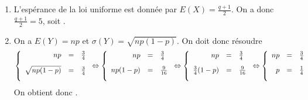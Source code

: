 \documentclass[a4paper, 11pt,reqno]{article}
\begin{document}
\begin{correction}  \;
	\begin{enumerate}
		\item L'esp\'erance de la loi uniforme est donn\'ee par $E(X) = \frac{q+1}{2}$. On a donc $\frac{q+1}{2} = 5$, soit .%
		\item On a $E(Y) = np$ et $\sigma(Y) = \sqrt{np(1-p)}$. On doit donc r\'esoudre
		      $$\left\{ \begin{array}{rcl}
				      np             & = & \frac{3}{4}\vsec  \\
				      \sqrt{np(1-p)} & = & \frac{3}{4} \vsec
			      \end{array} \right. \Leftrightarrow
			      \left\{ \begin{array}{rcl}
				      np       & = & \frac{3}{4}\vsec   \\
				      np (1-p) & = & \frac{9}{16} \vsec
			      \end{array} \right.
			      \Leftrightarrow
			      \left\{ \begin{array}{rcl}
				      np                & = & \frac{3}{4}\vsec   \\
				      \frac{3}{4} (1-p) & = & \frac{9}{16} \vsec
			      \end{array} \right.
			      \Leftrightarrow
			      \left\{ \begin{array}{rcl}
				      np & = & \frac{3}{4}\vsec  \\
				      p  & = & \frac{1}{4} \vsec
			      \end{array} \right.  $$
		      On obtient donc .

\end{enumerate}
\end{correction}
\end{document}
